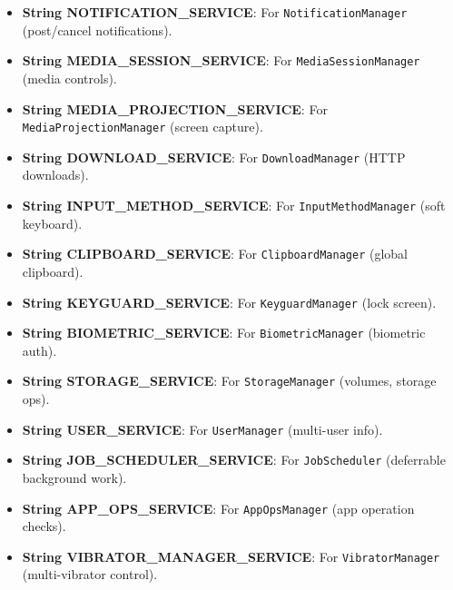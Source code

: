 \documentclass{report}
\begin{document}
\begin{itemize}
\begin{itemize}
                \item \textbf{String NOTIFICATION\_SERVICE}: For \texttt{NotificationManager} (post/cancel notifications).
                \item \textbf{String MEDIA\_SESSION\_SERVICE}: For \texttt{MediaSessionManager} (media controls).
                \item \textbf{String MEDIA\_PROJECTION\_SERVICE}: For \texttt{MediaProjectionManager} (screen capture).
                \item \textbf{String DOWNLOAD\_SERVICE}: For \texttt{DownloadManager} (HTTP downloads).

                \item \textbf{String INPUT\_METHOD\_SERVICE}: For \texttt{InputMethodManager} (soft keyboard).
                \item \textbf{String CLIPBOARD\_SERVICE}: For \texttt{ClipboardManager} (global clipboard).
                \item \textbf{String KEYGUARD\_SERVICE}: For \texttt{KeyguardManager} (lock screen).
                \item \textbf{String BIOMETRIC\_SERVICE}: For \texttt{BiometricManager} (biometric auth).

                \item \textbf{String STORAGE\_SERVICE}: For \texttt{StorageManager} (volumes, storage ops).
                \item \textbf{String USER\_SERVICE}: For \texttt{UserManager} (multi-user info).
                \item \textbf{String JOB\_SCHEDULER\_SERVICE}: For \texttt{JobScheduler} (deferrable background work).
                \item \textbf{String APP\_OPS\_SERVICE}: For \texttt{AppOpsManager} (app operation checks).

                \item \textbf{String VIBRATOR\_MANAGER\_SERVICE}: For \texttt{VibratorManager} (multi-vibrator control).


\end{itemize}
\end{itemize}
\end{document}
